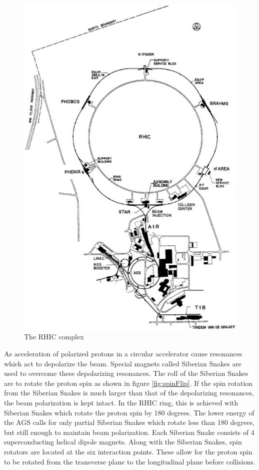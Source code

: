 \documentclass[abstract = on,listof=totoc, bibliography=totoc]{scrreprt}
\begin{document}
 \begin{figure}
\begin{center}
\includegraphics[width = 1\textwidth]{rhicBNL}
\caption[The RHIC complex]{The RHIC complex}
\label{fig:rhic}
\end{center}
\end{figure}
As acceleration of polarized protons in a circular accelerator cause resonances which act to depolarize the beam. Special magnets called Siberian Snakes are used to overcome these depolarizing resonances. The roll of the Siberian Snakes are to rotate the proton spin as shown in figure \ref{fig:spinFlip}. If the spin rotation from the Siberian Snakes is much larger than that of the depolarizing resonances, the beam polarization is kept intact. In the RHIC ring, this is achieved with Siberian Snakes which rotate the proton spin by 180 degrees. The lower energy of the AGS calls for only partial Siberian Snakes which rotate less than 180 degrees, but still enough to maintain beam polarization. \cite{ppCollider}
Each Siberian Snake consists of 4 superconducting helical dipole magnets. Along with the Siberian Snakes, spin rotators are located at the six interaction points. These allow for the proton spin to be rotated from the transverse plane to the longitudinal plane before collisions.  \cite{ppCollider}
\end{document}
